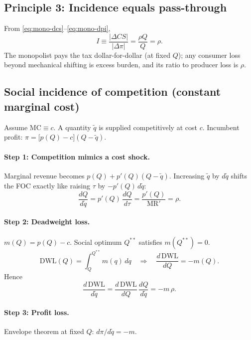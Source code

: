 \documentclass[11pt]{article}
\begin{document}
\subsection{Principle 3: Incidence equals pass-through}

From \eqref{eq:mono-dcs}--\eqref{eq:mono-dpi},
\[
  I \equiv \frac{|\Delta CS|}{|\Delta\pi|}
  = \frac{\rho Q}{Q}
  = \rho.
\]
The monopolist pays the tax dollar-for-dollar (at fixed $Q$); any consumer
loss beyond mechanical shifting is excess burden, and its ratio to producer
loss is $\rho$.

\subsection{Social incidence of competition (constant marginal cost)}

Assume $\mathrm{MC} \equiv c$.  A quantity $\tilde q$ is supplied
competitively at cost $c$.  Incumbent profit:
$\pi = \bigl[p(Q) - c\bigr](Q - \tilde q)$.

\paragraph{Step 1: Competition mimics a cost shock.}
Marginal revenue becomes $p(Q) + p'(Q)(Q - \tilde q)$.  Increasing
$\tilde q$ by $d\tilde q$ shifts the FOC exactly like raising $\tau$ by
$-p'(Q)\,d\tilde q$:
\[
  \frac{dQ}{d\tilde q} = p'(Q)\,\frac{dQ}{d\tau}
  = \frac{p'(Q)}{\mathrm{MR}'} = \rho.
\]

\paragraph{Step 2: Deadweight loss.}
$m(Q) = p(Q) - c$.  Social optimum $Q^{**}$ satisfies $m(Q^{**}) = 0$.
\[
  \mathrm{DWL}(Q) = \int_Q^{Q^{**}} m(q)\,dq
  \quad\Rightarrow\quad
  \frac{d\,\mathrm{DWL}}{dQ} = -m(Q).
\]
Hence
\[
  \frac{d\,\mathrm{DWL}}{d\tilde q}
  = \frac{d\,\mathrm{DWL}}{dQ}\,\frac{dQ}{d\tilde q}
  = -m\,\rho.
\]

\paragraph{Step 3: Profit loss.}
Envelope theorem at fixed $Q$: $d\pi/d\tilde q = -m$.
\end{document}
